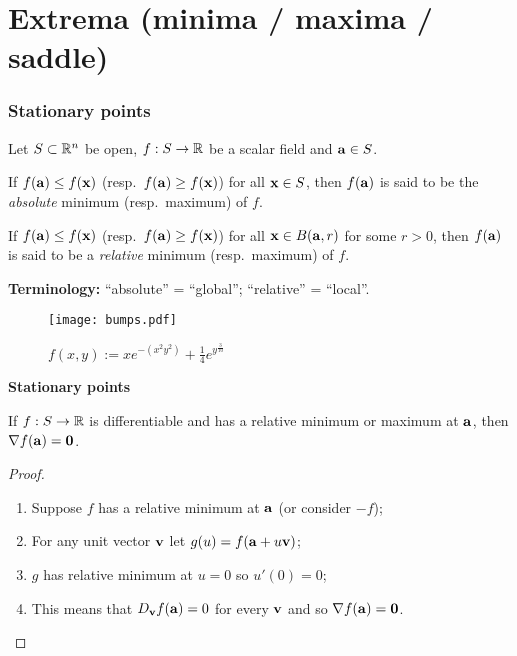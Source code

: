 \section{Extrema (minima / maxima / saddle)}

\subsubsection*{Stationary points}


Let \(S\subset \bR^n\) be open,
\(f:S \to \bR\) be a scalar field
and \(\aa \in S\).

\begin{definition}
    If \(f(\aa)\leq f(\xx)\) (resp.\ \(f(\aa)\geq f(\xx)\)) for all \(\xx \in S\), then \(f(\aa)\) is said to be the \emph{absolute} minimum (resp.\ maximum) of \(f\).
\end{definition}

\begin{definition}
    If \(f(\aa)\leq f(\xx)\) (resp.\ \(f(\aa)\geq f(\xx)\)) for all \(\xx \in B(\aa,r)\) for some \(r>0\), then \(f(\aa)\) is said to be a \emph{relative} minimum (resp.\ maximum) of \(f\).
\end{definition}


\textbf{Terminology:}
``absolute'' = ``global'';
``relative'' = ``local''.



\begin{figure}
    \centering
    \texttt{[image: bumps.pdf]}
    \caption{$f(x,y) := x e^{-(x^2y^2)}  + \frac{1}{4}e^{y^\frac{3}{10}}$}
\end{figure}




\textbf{Stationary points}


\begin{theorem}
    If \(f:S\to\bR\) is differentiable and has a relative minimum or maximum at \(\aa\), then \(\nabla f(\aa)=  \mathbf{0}\).
\end{theorem}

\begin{proof}
    \begin{enumerate}
        \item Suppose \(f\) has a relative minimum at \(\aa\) (or consider \(-f\));
        \item For any unit vector \(\vv\) let \(g(u) = f(\aa+u\vv)\);
        \item \(g\) has relative minimum at \(u=0\) so \(u'(0)=0\);
        \item This means that \(D_{\vv} f(\aa) = 0\) for every \(\vv\) and so \(\nabla f (\aa)= \mathbf{0}\). \qedhere
    \end{enumerate}
\end{proof}



